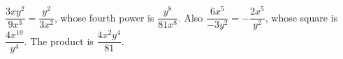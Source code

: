 $\dfrac{3xy^2}{9x^3}=\dfrac{y^2}{3x^2}$, whose fourth power is $\dfrac{y^8}{81x^8}$. Also $\dfrac{6x^5}{-3y^2}=-\dfrac{2x^5}{y^2}$, whose square is $\dfrac{4x^{10}}{y^4}$. The product is $\boxed{\dfrac{4x^2y^4}{81}}$.
